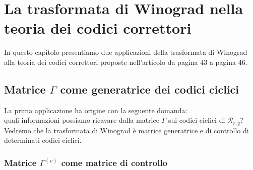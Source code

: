 \chapter{La trasformata di Winograd nella teoria dei codici correttori} \label{cap:applicazioni}

In questo capitolo presentiamo due applicazioni della trasformata di Winograd alla teoria dei codici correttori proposte nell'articolo \cite{cerruti} da pagina $43$ a pagina $46$.


\section{Matrice $\Gamma$ come generatrice dei codici ciclici}

La prima applicazione ha origine con la seguente domanda:\\
quali informazioni possiamo ricavare dalla matrice $\Gamma$ sui codici ciclici di $\mathcal{R}_{r,q} $? Vedremo che la trasformata di Winograd è matrice generatrice e di controllo di determinati codici ciclici.

\subsection{Matrice $\Gamma^{(v)}$ come matrice di controllo}

